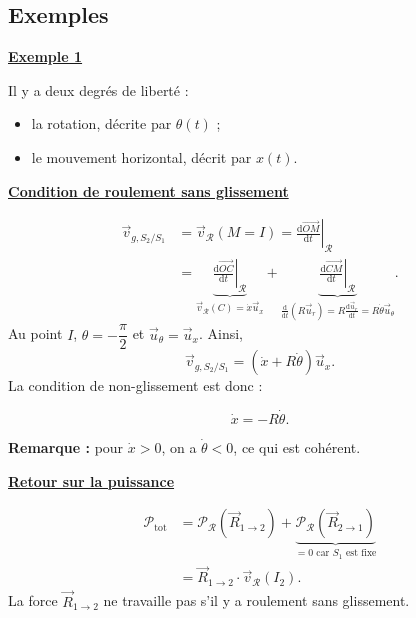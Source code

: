 \documentclass[11pt,a4paper]{article}
\newcommand{\dd}{\mathrm d}
\newcommand{\ux}{\vec u_x}\newcommand{\uy}{\vec u_y}\newcommand{\uz}{\vec u_z}
\newcommand{\titr}[1]{\par\textbf{\underline{#1}}\par\nopagebreak[3]}
\newcommand{\etoiles}[1]{\foreach \i in {1,...,#1}{\mathord{\star}\,}}
\newcommand{\RR}{\mathcal R}
\begin{document}
\subsection{Exemples}
\begin{exemple}[breakable]
\titr{Exemple 1}
\begin{minipage}{.49\linewidth}\centering
{}
\end{minipage}\hfill\begin{minipage}{.47\linewidth}
Il y a deux degrés de liberté :
\begin{itemize}
\item la rotation, décrite par $\theta(t)$ ;
\item le mouvement horizontal, décrit par $x(t)$.
\end{itemize}
\end{minipage}
\titr{Condition de roulement sans glissement}
\begin{align*}
\vec v_{g,S_2/S_1}&=\vec v_{\RR}(M=I)=\left.\frac{\dd\overrightarrow{OM}}{\dd t}\right|_{\RR}\\
&=\underbrace{\left.\frac{\dd\overrightarrow{OC}}{\dd t}\right|_{\RR}}_{\vec v_{\RR}(C)=\dot x\ux}
+\underbrace{\left.\frac{\dd\overrightarrow{CM}}{\dd t}\right|_{\RR}}_{\frac{\dd}{\dd t}(R\vec u_r)=R\frac{\dd\vec u_r}{\dd t}=R\dot\theta\vec u_\theta}.
\end{align*}
Au point $I$, $\theta=-\dfrac\pi2$ et $\vec u_\theta=\ux$. Ainsi,
\[\vec v_{g,S_2/S_1}=(\dot x+R\dot\theta)\ux.\]
La condition de non-glissement est donc :
\begin{cadre}[etoiles={\etoiles{3}}]\[\dot x=-R\dot\theta.\]\end{cadre}
\textbf{Remarque :} pour $\dot x>0$, on a $\dot\theta<0$, ce qui est cohérent.
\titr{Retour sur la puissance}
\begin{align*}
\mathcal P_{\mathrm{tot}}&=\mathcal P_{\RR}(\vec R_{1\to2})+\underbrace{\mathcal P_{\RR}(\vec R_{2\to1})}_{=0\text{ car }S_1\text{ est fixe}}\\
&=\vec R_{1\to2}\cdot\vec v_{\RR}(I_2).
\end{align*}
La force $\vec R_{1\to2}$ ne travaille pas s'il y a roulement sans glissement.
\end{exemple}
\end{document}
